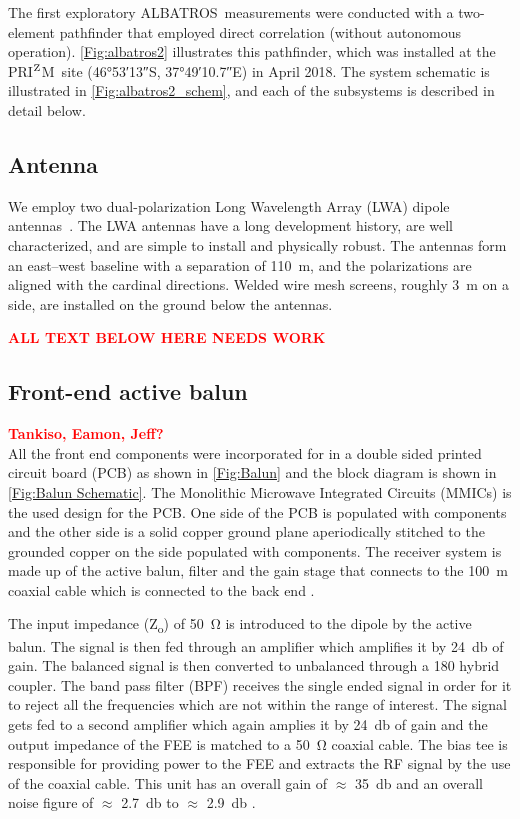 \documentclass{ws-jai}
\def\albatros{ALBATROS}
\def\prizm{PRI$^{\rm Z}$M}
\begin{document}
The first exploratory \albatros\ measurements were conducted with a
two-element pathfinder that employed direct correlation (without
autonomous operation).  \autoref{Fig:albatros2} illustrates this
pathfinder, which was installed at the \prizm\ site (\ang{46;53;13}S,
\ang{37;49;10.7}E) in April 2018.  The system schematic is illustrated
in \autoref{Fig:albatros2_schem}, and each of the subsystems is
described in detail below.

\subsection{Antenna}	
We employ two dual-polarization Long Wavelength Array (LWA) dipole
antennas~\citep{Memo28}.  The LWA antennas have a long development
history, are well characterized, and are simple to install and
physically robust.  The antennas form an east--west baseline with a
separation of \SI{110}{m}, and the polarizations are aligned with the
cardinal directions.  Welded wire mesh screens, roughly 3~m on a side,
are installed on the ground below the antennas.

\textcolor{red}{\bf ALL TEXT BELOW HERE NEEDS WORK}

\subsection{Front-end active balun}
\textcolor{red}{\bf Tankiso, Eamon, Jeff?} \\
All the front end components were incorporated for in a double sided
printed circuit board (PCB) as shown in \autoref{Fig:Balun} and the
block diagram is shown in \autoref{Fig:Balun Schematic}. The
Monolithic Microwave Integrated Circuits (MMICs) is the used design
for the PCB. One side of the PCB is populated with components and the
other side is a solid copper ground plane aperiodically stitched to
the grounded copper on the side populated with components. The
receiver system is made up of the active balun, filter and the gain
stage that connects to the \SI{100}{\metre} coaxial cable which is
connected to the back end \cite{2012PASP..124.1090H}.

The input impedance (Z\textsubscript{o}) of \SI{50}{\ohm} is
introduced to the dipole by the active balun. The signal is then fed
through an amplifier which amplifies it by \SI{+24}{\decibel} of
gain. The balanced signal is then converted to unbalanced through a
180 \degree hybrid coupler. The band pass filter (BPF) receives the
single ended signal in order for it to reject all the frequencies
which are not within the range of interest. The signal gets fed to a
second amplifier which again amplies it by \SI{+24}{\decibel} of gain
and the output impedance of the FEE is matched to a \SI{50}{\ohm}
coaxial cable. The bias tee is responsible for providing power to the
FEE and extracts the RF signal by the use of the coaxial cable. This
unit has an overall gain of $\approx$ \SI{35}{\decibel} and an overall
noise figure of $\approx$ \SI{2.7}{\decibel} to $\approx$
\SI{2.9}{\decibel} \cite{Memo35}.
\end{document}
